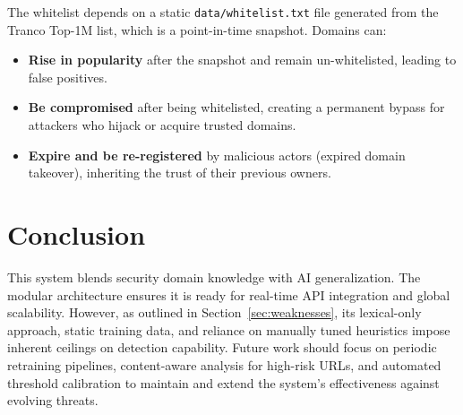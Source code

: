 \documentclass[12pt,a4paper]{article}
\begin{document}
The whitelist depends on a static \texttt{data/whitelist.txt} file generated from the Tranco Top-1M list, which is a point-in-time snapshot. Domains can:
\begin{itemize}
    \item \textbf{Rise in popularity} after the snapshot and remain un-whitelisted, leading to false positives.
    \item \textbf{Be compromised} after being whitelisted, creating a permanent bypass for attackers who hijack or acquire trusted domains.
    \item \textbf{Expire and be re-registered} by malicious actors (expired domain takeover), inheriting the trust of their previous owners.
\end{itemize}

\section{Conclusion}

This system blends security domain knowledge with AI generalization. The modular architecture ensures it is ready for real-time API integration and global scalability. However, as outlined in Section~\ref{sec:weaknesses}, its lexical-only approach, static training data, and reliance on manually tuned heuristics impose inherent ceilings on detection capability. Future work should focus on periodic retraining pipelines, content-aware analysis for high-risk URLs, and automated threshold calibration to maintain and extend the system's effectiveness against evolving threats.
\end{document}
